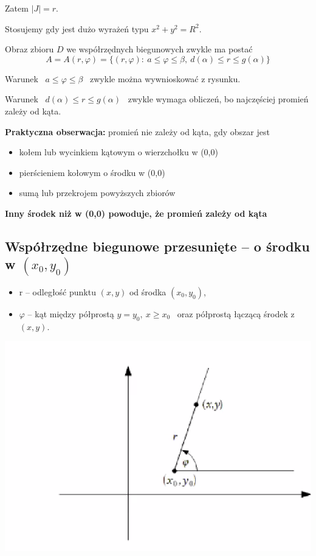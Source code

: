 Zatem $ |J| = r $.

Stosujemy gdy jest dużo wyrażeń typu $x^2 + y^2 = R^2 $.

Obraz zbioru $D$ we współrzędnych biegunowych zwykle ma postać
\[ A = A(r, \varphi) = \{ (r, \varphi): \ a \leq \varphi \leq \beta, \ d(\alpha) \leq r \leq g(\alpha) \} \]

Warunek \ $ a \leq \varphi \leq \beta $ \ zwykle można wywnioskować z rysunku.

Warunek \ $ d(\alpha) \leq r \leq g(\alpha) $ \ zwykle wymaga obliczeń, bo najczęściej promień zależy od kąta.

\textbf{Praktyczna obserwacja:} promień nie zależy od kąta, gdy obszar jest
\begin{itemize}
    \item kołem lub wycinkiem kątowym o wierzchołku w (0,0)
    \item pierścieniem kołowym o środku w (0,0)
    \item sumą lub przekrojem powyższych zbiorów
\end{itemize}

\textbf{Inny środek niż w (0,0) powoduje, że promień zależy od kąta}

\subsection{Współrzędne biegunowe przesunięte -- o środku w $(x_0, y_0)$}
\begin{itemize}
    \item r -- odległość punktu $(x,y)$ od środka $(x_0, y_0)$,
    \item $\varphi$ -- kąt między półprostą $ y = y_0, \ x \geq x_0 $ \ oraz półprostą łączącą środek z $(x,y)$.
\end{itemize}

\begin{center}
\includegraphics[scale=0.5]{img/katbiegun.png}
\end{center}


